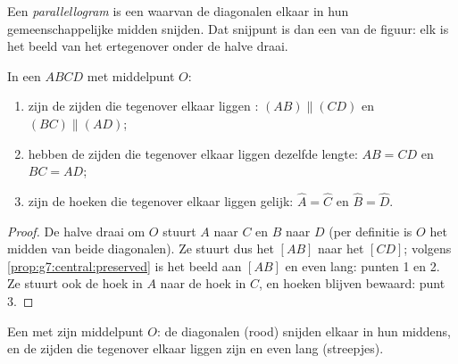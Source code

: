 \begin{definition}[Parallellogram]\label{def:g7:central:parallelogram}
Een \emph{parallellogram} is een  waarvan de
diagonalen elkaar in hun gemeenschappelijke midden snijden. Dat snijpunt is dan een
 van de figuur: elk  is het beeld van het 
ertegenover onder de halve draai.
\end{definition}

\begin{theorem}\label{thm:g7:central:properties}
In een  $ABCD$ met middelpunt $O$:
\begin{enumerate}
  \item zijn de zijden die tegenover elkaar liggen :
        $(AB) \parallel (CD)$ en $(BC) \parallel (AD)$;
  \item hebben de zijden die tegenover elkaar liggen dezelfde lengte: $AB = CD$ en
        $BC = AD$;
  \item zijn de hoeken die tegenover elkaar liggen gelijk: $\widehat A = \widehat C$
        en $\widehat B = \widehat D$.
\end{enumerate}
\end{theorem}

\begin{proof}
De halve draai om $O$ stuurt $A$ naar $C$ en $B$ naar $D$ (per definitie is $O$ het
midden van beide diagonalen). Ze stuurt dus het  $[AB]$ naar het 
$[CD]$; volgens \cref{prop:g7:central:preserved} is het beeld  aan $[AB]$
en even lang: punten 1 en 2. Ze stuurt ook de hoek in $A$ naar de hoek in $C$, en
hoeken blijven bewaard: punt 3.
\end{proof}

\begin{omfigure}

{\small Een  met zijn middelpunt $O$: de diagonalen (rood) snijden
elkaar in hun middens, en de zijden die tegenover elkaar liggen zijn  en
even lang (streepjes).}
\end{omfigure}

